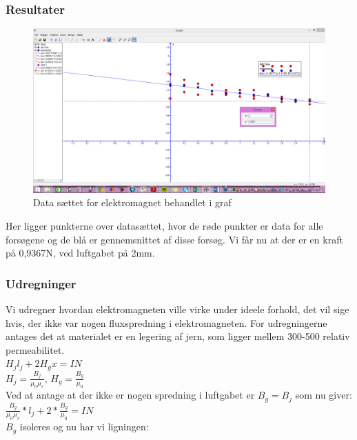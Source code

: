 \newpage
\subsubsection*{Resultater}
\begin{figure}[h!]
\center
\includegraphics[scale=0.4]{./Graphics/Graf_Elektromagnet_resultater}
\caption{Data sættet for elektromagnet behandlet i graf}
\label{Elektromagnet}
\end{figure}

Her ligger punkterne over datasættet, hvor de røde punkter er data for alle forsøgene og de blå er gennemsnittet af disse forsøg. Vi får nu at der er en kraft på 0,9367N, ved luftgabet på 2mm.

\subsubsection*{Udregninger}
Vi udregner hvordan elektromagneten ville virke under ideele forhold, det vil sige hvis, der ikke var nogen fluxspredning i elektromagneten. For udregningerne antages det at materialet er en legering af jern, som ligger mellem 300-500 relativ permeabilitet.\\

$H_{j}l_{j}+2H_{g}x=IN$ \\

$H_{j}=\frac{B_{j}}{\mu_{0}\mu_{r}},\,H_{g}=\frac{B_{g}
}{\mu_{0}}$\\

Ved at antage at der ikke er nogen spredning i luftgabet er $B_{g}=B_{j}$ som nu giver:\\

$\frac{B_{g}}{\mu_{0}\mu_{r}}*l_{j}+2*\frac{B_{g}}{\mu_{0}}=IN$\\

$B_{g}$ isoleres og nu har vi ligningen:\\

